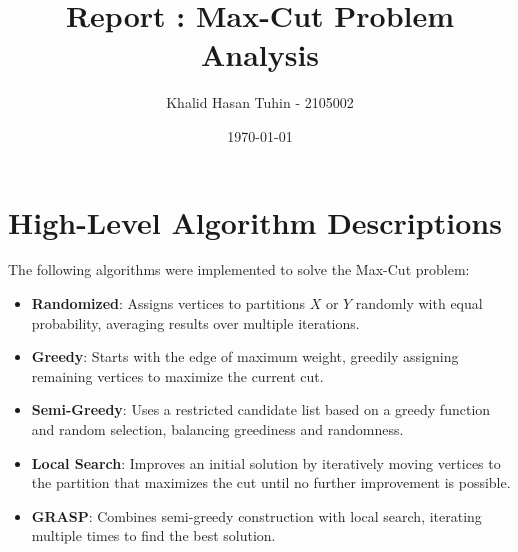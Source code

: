 \documentclass{article}%
\title{Report : Max-Cut Problem Analysis}%
\author{Khalid Hasan Tuhin - 2105002}%
\date{\today}%
\begin{document}
%
\normalsize%
\maketitle%
\section{High{-}Level Algorithm Descriptions}%
\label{sec:High{-}LevelAlgorithmDescriptions}%
The following algorithms were implemented to solve the Max{-}Cut problem:%
\begin{itemize}%
\item \textbf{Randomized}: Assigns vertices to partitions \(X\) or \(Y\) randomly with equal probability, averaging results over multiple iterations.%
\item \textbf{Greedy}: Starts with the edge of maximum weight, greedily assigning remaining vertices to maximize the current cut.%
\item \textbf{Semi-Greedy}: Uses a restricted candidate list based on a greedy function and random selection, balancing greediness and randomness.%
\item \textbf{Local Search}: Improves an initial solution by iteratively moving vertices to the partition that maximizes the cut until no further improvement is possible.%
\item \textbf{GRASP}: Combines semi-greedy construction with local search, iterating multiple times to find the best solution.%
\end{itemize}

%
\end{document}

